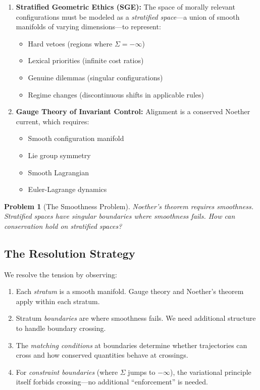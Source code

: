 \documentclass[11pt,a4paper]{article}
\newtheorem{problem}[theorem]{Problem}
\begin{document}
\begin{enumerate}
    \item \textbf{Stratified Geometric Ethics (SGE):} The space of morally relevant configurations must be modeled as a \textit{stratified space}---a union of smooth manifolds of varying dimensions---to represent:
    \begin{itemize}
        \item Hard vetoes (regions where $\Sigma = -\infty$)
        \item Lexical priorities (infinite cost ratios)
        \item Genuine dilemmas (singular configurations)
        \item Regime changes (discontinuous shifts in applicable rules)
    \end{itemize}

    \item \textbf{Gauge Theory of Invariant Control:} Alignment is a conserved Noether current, which requires:
    \begin{itemize}
        \item Smooth configuration manifold
        \item Lie group symmetry
        \item Smooth Lagrangian
        \item Euler-Lagrange dynamics
    \end{itemize}
\end{enumerate}

\begin{problem}[The Smoothness Problem]
Noether's theorem requires smoothness. Stratified spaces have singular boundaries where smoothness fails. How can conservation hold on stratified spaces?
\end{problem}

\subsection{The Resolution Strategy}

We resolve the tension by observing:

\begin{enumerate}
    \item Each \textit{stratum} is a smooth manifold. Gauge theory and Noether's theorem apply within each stratum.

    \item Stratum \textit{boundaries} are where smoothness fails. We need additional structure to handle boundary crossing.

    \item The \textit{matching conditions} at boundaries determine whether trajectories can cross and how conserved quantities behave at crossings.

    \item For \textit{constraint boundaries} (where $\Sigma$ jumps to $-\infty$), the variational principle itself forbids crossing---no additional ``enforcement'' is needed.
\end{enumerate}
\end{document}
